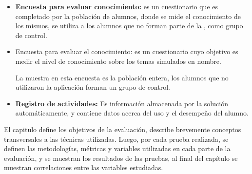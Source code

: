 \begin{itemize}
    \item \textbf{Encuesta para evaluar conocimiento:} es un cuestionario que es
        completado por la población de alumnos, donde se mide el conocimiento de
        los mismos, se utiliza a los  alumnos que
        no forman parte de la , como grupo de control.

    \item Encuesta para evaluar el conocimiento: es un cuestionario cuyo
        objetivo es medir el nivel de conocimiento sobre los temas simulados en
        \gls{nombre}. 
        
        La muestra en esta encuesta es la población entera, los alumnos que no
        utilizaron la aplicación forman un grupo de control.
        
    \item \textbf{Registro de actividades:} Es información almacenada por la
        solución automáticamente, y contiene datos acerca del uso y el desempeño
        del alumno.
        
\end{itemize}

El capitulo define los objetivos de la evaluación, describe brevemente conceptos
transversales a las técnicas utilizadas. Luego, por cada prueba realizada, se
definen las metodologías, métricas y variables utilizadas en cada parte de la
evaluación, y se muestran los resultados de las pruebas, al final del capítulo
se muestran correlaciones entre las variables estudiadas.










